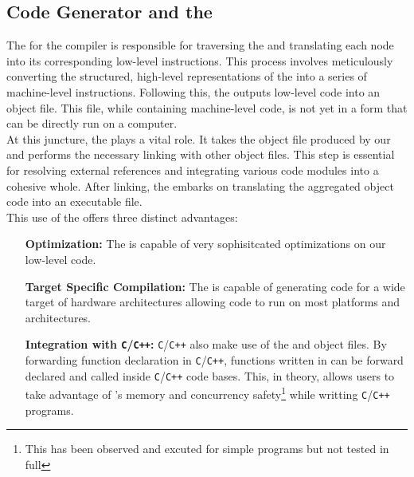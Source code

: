 \subsection{Code Generator and the \gcc{}}
\label{sec:LLVM}

The \codeGen{} for the \lang{} compiler is responsible for traversing the
\ast{} and translating each node into its corresponding low-level
instructions. This process involves meticulously converting the structured,
high-level representations of the \ast{} into a series of machine-level instructions.
Following this, the \codeGen{} outputs low-level code into an object file.
This file, while containing machine-level code, is not yet in a form that can be
directly run on a computer. \\

At this juncture, the \gcc{} plays a vital role. It
takes the object file produced by our \codeGen{} and performs the necessary
linking with other object files. This step is essential for resolving external
references and integrating various code modules into a cohesive whole. After linking,
the \gcc{} embarks on translating the aggregated object code into an executable file. \\

This use of the \gcc{} offers three distinct advantages: 

\begin{itemize}
  \item[\textbf{Optimization:}] The \gcc{} is capable of very sophisitcated
    optimizations on our low-level code.
  \item[\textbf{Target Specific Compilation:}] The \gcc{} is capable of generating code
    for a wide target of hardware architectures allowing \lang{} code to run on most
    platforms and architectures.
  \item[\textbf{Integration with \texttt{C}/\texttt{C++}:}] \texttt{C}/\texttt{C++} also make use of the \gcc{} and
    object files. By forwarding function declaration in \texttt{C}/\texttt{C++}, functions written in
    \lang{} can be forward declared and called inside \texttt{C}/\texttt{C++} code
    bases. This, in theory, allows
    users to take advantage of \lang{}'s memory and concurrency
    safety\footnote{This has been observed and excuted for simple programs but
    not tested in full} while writting \texttt{C}/\texttt{C++} programs.
\end{itemize}

